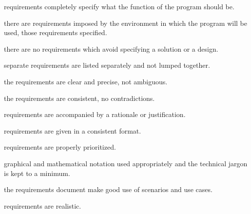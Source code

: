 \documentclass[18 pt]{article}
\begin{document}
\begin{Large}
\begin{flushleft}
\makebox[0pt][l]{$\square$}\raisebox{.15ex}{\hspace{0.1em}$\checkmark$}
requirements completely specify what the function of the program should be.

\makebox[0pt][l]{$\square$}\raisebox{.15ex}{\hspace{0.1em}$\checkmark$}
there are requirements imposed by the environment in which the program will be used, those requirements specified.

\makebox[0pt][l]{$\square$}\raisebox{.15ex}{\hspace{0.1em}$\checkmark$}
there are no requirements which avoid specifying a solution or a design.

\makebox[0pt][l]{$\square$}\raisebox{.15ex}{\hspace{0.1em}$\checkmark$}
separate requirements are listed separately and not lumped together.

\makebox[0pt][l]{$\square$}\raisebox{.15ex}{\hspace{0.1em}$\checkmark$}
the requirements are clear and precise, not ambiguous.

\makebox[0pt][l]{$\square$}\raisebox{.15ex}{\hspace{0.1em}$\checkmark$}
the requirements are consistent, no contradictions.

\makebox[0pt][l]{$\square$}\raisebox{.15ex}{\hspace{0.1em}$\checkmark$}
requirements are accompanied by a rationale or justification.

\makebox[0pt][l]{$\square$}\raisebox{.15ex}{\hspace{0.1em}$\checkmark$}
requirements are given in a consistent format.

\makebox[0pt][l]{$\square$}\raisebox{.15ex}{\hspace{0.1em}$\checkmark$}
requirements are properly prioritized.
 
\makebox[0pt][l]{$\square$}\raisebox{.15ex}{\hspace{0.1em}$\checkmark$}
graphical and mathematical notation used appropriately and the technical jargon is kept to a minimum.

\makebox[0pt][l]{$\square$}\raisebox{.15ex}{\hspace{0.1em}$\checkmark$}
the requirements document make good use of scenarios and use cases.

\makebox[0pt][l]{$\square$}\raisebox{.15ex}{\hspace{0.1em}$\checkmark$}
requirements are realistic.


\end{flushleft}
\end{Large}
\end{document}
